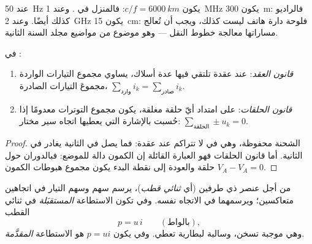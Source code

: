 \begin{example}\label{ex:b1:dc-circuits:arqs}
عند \qty{50}{Hz} يكون $c/f = \qty{6000}{km}$: فالمنزل في . وعند \qty{1}{MHz} يكون \qty{300}{m}: فالراديو كذلك أيضًا. وعند \qty{2}{GHz}
يكون \qty{15}{cm}: فلوحة دارة هاتف ليست كذلك، ويجب أن تُعالج مساراتها
معالجة خطوط النقل --- وهو موضوع من مواضيع مجلد السنة الثانية.
\end{example}

\begin{theorem}\label{thm:b1:dc-circuits:kirchhoff}
في :
\begin{enumerate}
  \item \emph{قانون العقد}: عند عقدة تلتقي فيها عدة أسلاك، يساوي مجموع
        التيارات الواردة مجموعَ التيارات الصادرة،
        $\sum_{\text{وارد}} i_k = \sum_{\text{صادر}} i_k$.
  \item \emph{قانون الحلقات}: على امتداد أيّ حلقة مغلقة، يكون مجموع التوترات
        معدومًا إذا حُسبت بالإشارة التي يعطيها اتجاه سير
        مختار: $\sum_{\text{الحلقة}} \pm u_k = 0$.
\end{enumerate}
\end{theorem}

\begin{proof}
الشحنة محفوظة، وهي في  لا تتراكم
عند عقدة: فما يصل في الثانية يغادر في الثانية. أما قانون الحلقات
فهو العبارة القائلة إن الكمون دالة للموضع: فبالدوران
حول حلقة والعودة إلى نقطة البدء يكون مجموع هبوطات
الكمون $V_A - V_A = 0$.
\end{proof}

\begin{notation}\label{not:b1:dc-circuits:conventions}
من أجل عنصر ذي طرفين (أي \emph{ثنائي قطب})، يرسم \emph{} سهم  وسهم التيار في اتجاهين
متعاكسين؛ ويرسمهما \emph{} في الاتجاه
نفسه. وفي  تكون الاستطاعة \emph{المستقبَلة} في
ثنائي القطب
\[
p = u\,i \qquad (\text{بالواط}),
\]
وهي موجبة  تسخن، وسالبة لبطارية
تعطي. وفي  يكون $p = ui$ هو الاستطاعة
\emph{المقدَّمة}.
\end{notation}

